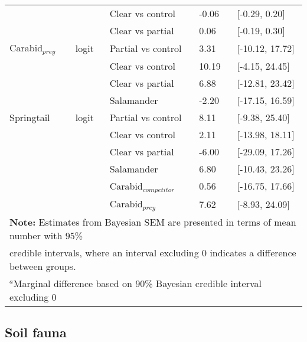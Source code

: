 \begin{table}[ht]
\begin{tabular}{lllll}
             && Clear vs control  & -0.06 & [-0.29, 0.20] \\ 
                          && Clear vs partial  & \hspace{1mm}0.06 & [-0.19, 0.30] \\ 
      Carabid$_{prey}$    &logit& Partial vs control & \hspace{1mm}3.31 & [-10.12, 17.72] \\
                   && Clear vs control  & \hspace{1mm}10.19 & [-4.15, 24.45] \\ 
                          && Clear vs partial  & \hspace{1mm}6.88 & [-12.81, 23.42] \\  
                          && Salamander        & -2.20 & [-17.15, 16.59] \\  
      Springtail          &logit& Partial vs control & \hspace{1mm}8.11 & [-9.38, 25.40] \\
                   && Clear vs control  & \hspace{1mm}2.11 & [-13.98, 18.11] \\ 
                          && Clear vs partial  & -6.00 & [-29.09, 17.26] \\  
                          && Salamander        & \hspace{1mm}6.80 & [-10.43, 23.26] \\ 
                          && Carabid$_{competitor}$      & \hspace{1mm}0.56 & [-16.75, 17.66] \\ 
                          && Carabid$_{prey}$      & \hspace{1mm}7.62 & [-8.93, 24.09] \\ 
      \hline
      \multicolumn{5}{l}{\textbf{Note:} Estimates from Bayesian SEM are presented in terms of mean number with 95\%} \\
      \multicolumn{5}{l}{credible intervals, where an interval excluding 0 indicates a difference between groups.} \\
      \multicolumn{5}{l}{$^{a}$Marginal difference based on 90\% Bayesian credible interval excluding 0}
  \end{tabular}
\end{table}

\vspace{0.5cm}



\subsection*{Soil fauna}
\label{subsec:taxa}

